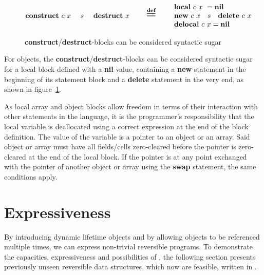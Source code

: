 \begin{figure}[h]
    \centering
    \begin{equation*}
        \textbf{construct}\ c\ x\ \quad s\ \quad \textbf{destruct}\ x\ \qquad \overset{\textbf{def}}{\scalebox{1.8}{=}} \qquad \begin{array}{ l }
            \textbf{local}\ c\ x\ = \textbf{nil}\\
            \textbf{new}\ c\ x \quad s \quad \textbf{delete}\ c\ x\\
            \textbf{delocal}\ c\ x = \textbf{nil} 
        \end{array}
      \end{equation*}
    \caption{\textbf{construct}/\textbf{destruct}-blocks can be considered syntactic sugar}
    \label{fig:sugar-construct-destruct}
\end{figure}

For objects, the \textbf{construct}/\textbf{destruct}-blocks can be considered syntactic sugar for a local block defined with a \textbf{nil} value, containing a \textbf{new} statement in the beginning of its statement block and a \textbf{delete} statement in the very end, as shown in figure~\ref{fig:sugar-construct-destruct}.

As local array and object blocks allow freedom in terms of their interaction with other statements in the language, it is the programmer's responsibility that the local variable is deallocated using a correct expression at the end of the block definition. The value of the variable is a pointer to an object or an array. Said object or array must have all fields/cells zero-cleared before the pointer is zero-cleared at the end of the local block. If the pointer is at any point exchanged with the pointer of another object or array using the \textbf{swap} statement, the same conditions apply.  

\newpage
\section{\rooplpp Expressiveness}
\label{sec:rooplpp-expressiveness}
By introducing dynamic lifetime objects and by allowing objects to be referenced multiple times, we can express non-trivial reversible programs. To demonstrate the capacities, expressiveness and possibilities of \rooplpp, the following section presents previously unseen reversible data structures, which now are feasible, written in \rooplpp.

